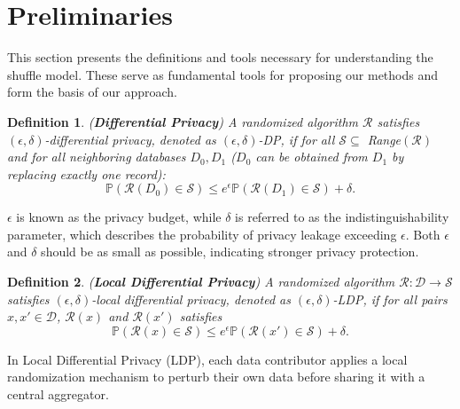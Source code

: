 \documentclass[letterpaper]{article} %
\newtheorem{definition}{Definition}
\begin{document}
\section{Preliminaries}
This section presents the definitions and tools necessary for understanding the shuffle model. These serve as fundamental tools for proposing our methods and form the basis of our approach.
\begin{definition}\label{ApprDP}({\bf Differential Privacy})
A randomized algorithm $\mathcal{R}$ %
satisfies $(\epsilon,\delta)$-differential privacy, denoted as $(\epsilon,\delta)$-DP, if for all $\mathcal{S} \subseteq$ Range$(\mathcal{R})$ and for all neighboring databases $D_0, D_1$ ($D_0$ can be obtained from $D_1$ by
replacing exactly one record):
\begin{equation}\label{epsilonDeltaDis}
\mathbb{P}( \mathcal{R}(D_0)\in \mathcal{S}) \leq e^\epsilon \mathbb{P}(\mathcal{R}(D_1) \in \mathcal{S})+\delta.
\end{equation}
\end{definition}
$\epsilon$ is known as the privacy budget, while
 $\delta$ is referred to as the indistinguishability parameter, which describes the probability of privacy leakage exceeding
$\epsilon$. Both $\epsilon$ and $\delta$ should be as small as possible, indicating stronger privacy protection.
\begin{definition}({\bf Local Differential Privacy})
A randomized algorithm $\mathcal{R}:\mathcal{D} \rightarrow \mathcal{S}$ satisfies $(\epsilon,\delta)$-local differential privacy, denoted as $(\epsilon,\delta)$-LDP, if for all pairs $x,x' \in \mathcal{D}$, $\mathcal{R}(x)$ and $\mathcal{R}(x')$ satisfies
\begin{equation}\label{epsilonDeltaDis}
\mathbb{P}( \mathcal{R}(x)\in \mathcal{S}) \leq e^\epsilon \mathbb{P}(\mathcal{R}(x') \in \mathcal{S})+\delta.
\end{equation}
\end{definition}
In Local Differential Privacy (LDP), each data contributor applies a local randomization mechanism to perturb their own data before sharing it with a central aggregator.
\end{document}
